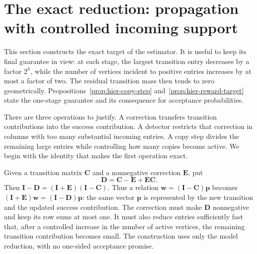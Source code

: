 \documentclass[11pt]{article}
\numberwithin{equation}{section}
\theoremstyle{definition}
\theoremstyle{remark}
\begin{document}
\section{The exact reduction: propagation with controlled incoming support}
\label{sec:hierarchy}

This section constructs the exact target of the estimator. It is useful to keep its final guarantee in view: at each stage, the largest transition entry decreases by a factor $2^{h}$, while the number of vertices incident to positive entries increases by at most a factor of two. The residual transition mass then tends to zero geometrically. Propositions~\ref{prop:hier-copy-step} and~\ref{prop:hier-reward-target} state the one-stage guarantee and its consequence for acceptance probabilities.

There are three operations to justify. A correction transfers transition contributions into the success contribution. A detector restricts that correction in columns with too many substantial incoming entries. A copy step divides the remaining large entries while controlling how many copies become active. We begin with the identity that makes the first operation exact.

Given a transition matrix ${\mathbf{C}}$ and a nonnegative correction ${\mathbf{E}}$, put
\[
 {\mathbf{D}}={\mathbf{C}}-{\mathbf{E}}+{\mathbf{E}}{\mathbf{C}}.
\]
Then ${\mathbf{I}}-{\mathbf{D}}=({\mathbf{I}}+{\mathbf{E}})({\mathbf{I}}-{\mathbf{C}})$. Thus a relation ${\mathbf{w}}=({\mathbf{I}}-{\mathbf{C}}){\mathbf{p}}$ becomes
$({\mathbf{I}}+{\mathbf{E}}){\mathbf{w}}=({\mathbf{I}}-{\mathbf{D}}){\mathbf{p}}$: the same vector ${\mathbf{p}}$ is represented by the new transition
and the updated success contribution. The correction must make ${\mathbf{D}}$ nonnegative and keep
its row sums at most one. It must also reduce entries sufficiently fast
that, after a controlled increase in the number of active vertices, the
remaining transition contribution becomes small.  The construction uses
only the model reduction, with no one-sided acceptance promise.
\end{document}
